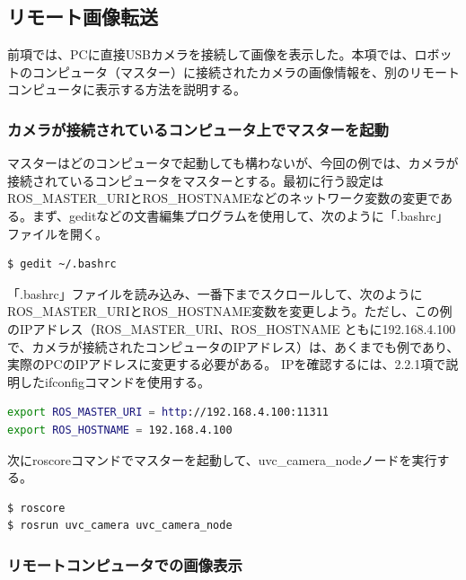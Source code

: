 \subsection{リモート画像転送}

前項では、PCに直接USBカメラを接続して画像を表示した。本項では、ロボットのコンピュータ（マスター）に接続されたカメラの画像情報を、別のリモートコンピュータに表示する方法を説明する。

\subsubsection{カメラが接続されているコンピュータ上でマスターを起動}

マスターはどのコンピュータで起動しても構わないが、今回の例では、カメラが接続されているコンピュータをマスターとする。最初に行う設定はROS\_MASTER\_URIとROS\_HOSTNAMEなどのネットワーク変数の変更である。まず、geditなどの文書編集プログラムを使用して、次のように「.bashrc」ファイルを開く。

\begin{lstlisting}[language=ROS]
$ gedit ~/.bashrc
\end{lstlisting}

「.bashrc」ファイルを読み込み、一番下までスクロールして、次のようにROS\_MASTER\_URIとROS\_HOSTNAME変数を変更しよう。ただし、この例のIPアドレス（ROS\_MASTER\_URI、ROS\_HOSTNAME ともに192.168.4.100で、カメラが接続されたコンピュータのIPアドレス）は、あくまでも例であり、実際のPCのIPアドレスに変更する必要がある。 IPを確認するには、2.2.1項で説明したifconfigコマンドを使用する。

\begin{lstlisting}[language=bash]
export ROS_MASTER_URI = http://192.168.4.100:11311
export ROS_HOSTNAME = 192.168.4.100
\end{lstlisting}

次にroscoreコマンドでマスターを起動して、uvc\_camera\_nodeノードを実行する。

\begin{lstlisting}[language=ROS]
$ roscore
$ rosrun uvc_camera uvc_camera_node
\end{lstlisting}

\subsubsection{リモートコンピュータでの画像表示}

